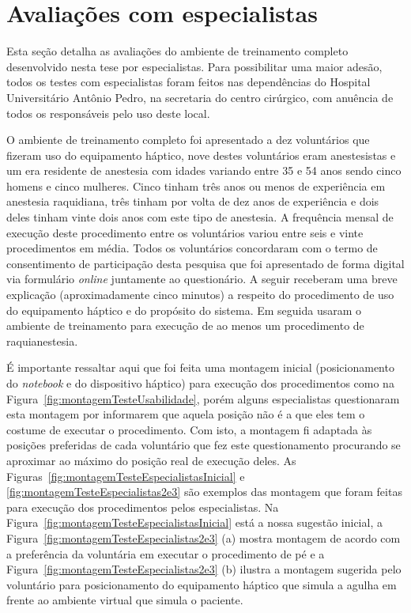 \section{Avaliações com especialistas}
\label{sec:testeEspecialistas}

Esta seção detalha as avaliações do ambiente de treinamento completo desenvolvido nesta tese por especialistas. Para possibilitar uma maior adesão, todos os testes com especialistas foram feitos nas dependências do Hospital Universitário Antônio Pedro, na secretaria do centro cirúrgico, com anuência de todos os responsáveis pelo uso deste local.

O ambiente de treinamento completo foi apresentado a dez voluntários que fizeram uso do equipamento háptico, nove destes voluntários eram anestesistas e um era residente de anestesia com idades variando entre 35 e 54 anos sendo cinco homens e cinco mulheres. Cinco tinham três anos ou menos de experiência em anestesia raquidiana, três tinham por volta de dez anos de experiência e dois deles tinham vinte dois anos com este tipo de anestesia. A frequência mensal de execução deste procedimento entre os voluntários variou entre seis e vinte procedimentos em média. Todos os voluntários concordaram com o termo de consentimento de participação desta pesquisa que foi apresentado de forma digital via formulário \textit{online} juntamente ao questionário. A seguir receberam uma breve explicação (aproximadamente cinco minutos) a respeito do procedimento de uso do equipamento háptico e do propósito do sistema. Em seguida usaram o ambiente de treinamento para execução de ao menos um procedimento de raquianestesia. 

É importante ressaltar aqui que foi feita uma montagem inicial (posicionamento do \textit{notebook} e do dispositivo háptico) para execução dos procedimentos como na Figura~\ref{fig:montagemTesteUsabilidade}, porém alguns especialistas questionaram esta montagem por informarem que aquela posição não é a que eles tem o costume de executar o procedimento. Com isto, a montagem fi adaptada às posições preferidas de cada voluntário que fez este questionamento procurando se aproximar ao máximo do posição real de execução deles. As Figuras~\ref{fig:montagemTesteEspecialistasInicial} e \ref{fig:montagemTesteEspecialistas2e3} são exemplos das montagem que foram feitas para execução dos procedimentos pelos especialistas. Na Figura~\ref{fig:montagemTesteEspecialistasInicial} está a nossa sugestão inicial, a Figura~\ref{fig:montagemTesteEspecialistas2e3} (a) mostra montagem de acordo com a preferência da voluntária em executar o procedimento de pé e a Figura~\ref{fig:montagemTesteEspecialistas2e3} (b) ilustra a montagem sugerida pelo voluntário para posicionamento do equipamento háptico que simula a agulha em frente ao ambiente virtual que simula o paciente.

